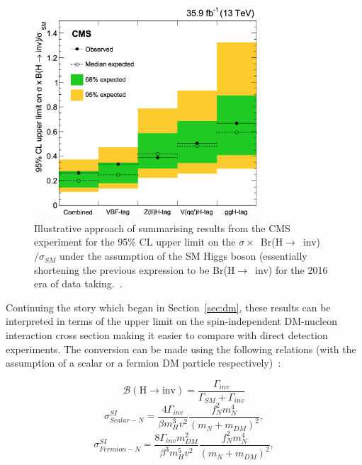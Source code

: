 \begin{figure}[htbp]
    \begin{center}
        \includegraphics[width=0.75\textwidth]{Theory/Limit2016.png}
        \caption{Illustrative approach of summarising results from the CMS experiment for the 95\% CL upper limit on the $\sigma \times$~Br(H$\rightarrow$~inv)$/\sigma_{SM}$ under the assumption of the SM Higgs boson (essentially shortening the previous expression to be Br(H$\rightarrow$~inv) for the 2016 era of data taking.~\cite{paper:HIG_17_023}.}
      \label{fig:limit_2016}
    \end{center}
  \end{figure}
  
\hspace{10pt} Continuing the story which began in Section~\ref{sec:dm}, these results can be interpreted in terms of the upper limit on the spin-independent DM-nucleon interaction cross section making it easier to compare with direct detection experiments. The conversion can be made using the following relations (with the assumption of a scalar or a fermion DM particle respectively)~\cite{paper:hinv_run1,paper:hig_portal_models1}:

\begin{equation}
    \mathcal{B}(\text{H}\rightarrow \text{inv}) = \frac{\Gamma_{inv}}{\Gamma_{SM}+\Gamma_{inv}}
\end{equation}
\begin{equation}
    \sigma^{SI}_{Scalar-N} = \frac{4\Gamma_{inv}}{\beta m^3_Hv^2}\frac{f_N^2m_N^4}{(m_N+m_{DM})^2},
\end{equation}
\begin{equation}
    \sigma^{SI}_{Fermion-N} = \frac{8\Gamma_{inv}m_{DM}^2}{\beta^3m^5_Hv^2}\frac{f_N^2m_N^4}{(m_N+m_{DM})^2},
\end{equation}

